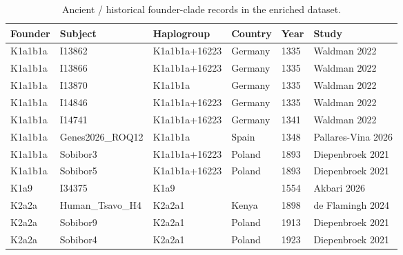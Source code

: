 \documentclass[11pt]{article}
\begin{document}
\begin{table}[htbp]
\centering
\footnotesize
\caption{Ancient / historical founder-clade records in the enriched dataset.}
\label{tab:anc}
\begin{tabular}{llllll}
\toprule
Founder & Subject & Haplogroup & Country & Year & Study \\
\midrule
K1a1b1a & I13862 & K1a1b1a+16223 & Germany &  1335 & Waldman 2022 \\
K1a1b1a & I13866 & K1a1b1a+16223 & Germany &  1335 & Waldman 2022 \\
K1a1b1a & I13870 & K1a1b1a & Germany &  1335 & Waldman 2022 \\
K1a1b1a & I14846 & K1a1b1a+16223 & Germany &  1335 & Waldman 2022 \\
K1a1b1a & I14741 & K1a1b1a+16223 & Germany &  1341 & Waldman 2022 \\
K1a1b1a & Genes2026\_ROQ12 & K1a1b1a & Spain &  1348 & Pallares-Vina 2026 \\
K1a1b1a & Sobibor3 & K1a1b1a+16223 & Poland &  1893 & Diepenbroek 2021 \\
K1a1b1a & Sobibor5 & K1a1b1a+16223 & Poland &  1893 & Diepenbroek 2021 \\
K1a9 & I34375 & K1a9 &  &  1554 & Akbari 2026 \\
K2a2a & Human\_Tsavo\_H4 & K2a2a1 & Kenya &  1898 & de Flamingh 2024 \\
K2a2a & Sobibor9 & K2a2a1 & Poland &  1913 & Diepenbroek 2021 \\
K2a2a & Sobibor4 & K2a2a1 & Poland &  1923 & Diepenbroek 2021 \\
\bottomrule
\end{tabular}
\end{table}
\end{document}
